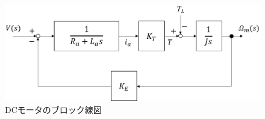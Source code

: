 \begin{figure}[htb]
  \centering
    \includegraphics[width=1.0\hsize]{picture/eps/dcm_block_diagram.eps}
    \caption{DCモータのブロック線図}
    \label{fig::dcm_block}
\end{figure}
